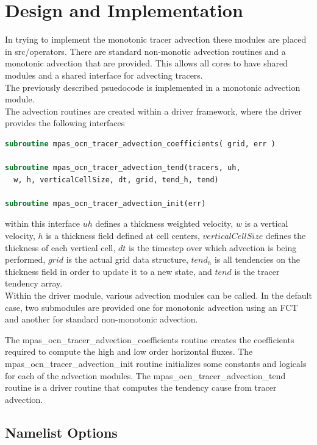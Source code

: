 \documentclass[11pt]{report}
\begin{document}
\chapter{Design and Implementation}
In trying to implement the monotonic tracer advection these modules are placed
in src/operators. There are standard non-monotic advection routines and a
monotonic advection that are provided. This allows all cores to have shared
modules and a shared interface for advecting tracers.  \\

The previously described psuedocode is implemented in a monotonic advection module.\\

The advection routines are created within a driver framework, where the driver provides the following interfaces
\begin{lstlisting}[language=fortran,escapechar=@,frame=single]
subroutine mpas_ocn_tracer_advection_coefficients( grid, err )

subroutine mpas_ocn_tracer_advection_tend(tracers, uh, 
  w, h, verticalCellSize, dt, grid, tend_h, tend)

subroutine mpas_ocn_tracer_advection_init(err)
\end{lstlisting}

within this interface $uh$ defines a thickness weighted
velocity, $w$ is a vertical velocity, $h$ is a thickness field defined at cell
centers, $verticalCellSize$ defines the thickness of each vertical cell, 
$dt$ is the timestep over which advection is being performed,
$grid$ is the actual grid data structure, $tend_h$ is all tendencies on
the thickness field in order to update it to a new state, and $tend$ is the
tracer tendency array. \\

Within the driver module, various advection modules can be called. In the
default case, two submodules are provided one for monotonic advection using an
FCT and another for standard non-monotonic advection.

The mpas\_ocn\_tracer\_advection\_coefficients routine creates the coefficients
required to compute the high and low order horizontal fluxes. The
mpas\_ocn\_tracer\_advection\_init routine initializes some constants and
logicals for each of the advection modules. The
mpas\_ocn\_tracer\_advection\_tend routine is a driver routine that computes
the tendency cause from tracer advection.

\section{Namelist Options}
\end{document}
